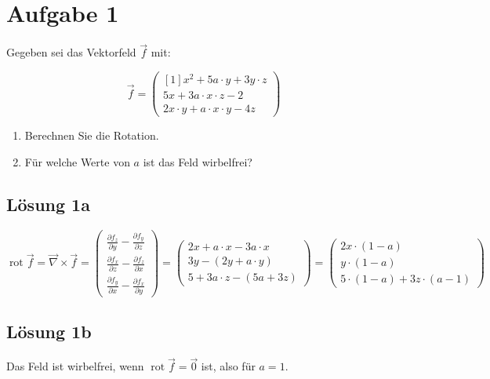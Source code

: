 \documentclass[main.tex]{subfiles}
\begin{document}
\section{Aufgabe 1}
Gegeben sei das Vektorfeld $\vec{f}$ mit:

$$
    \vec{f} = \begin{pmatrix}[1]
        x^2 + 5a \cdot y + 3y\cdot z \\
        5x + 3a\cdot x\cdot z - 2 \\
        2x\cdot y + a\cdot x \cdot y - 4z
    \end{pmatrix}
$$
\begin{enumerate}
    \item Berechnen Sie die Rotation.
    \item Für welche Werte von $a$ ist das Feld wirbelfrei?
\end{enumerate}

\subsection{Lösung 1a}

\arraycolsep=1pt %

$$
    \operatorname{rot} \vec{f} = \vec{\nabla} \times \vec{f} = \begin{pmatrix}
        \frac{\partial f_z}{\partial y} - \frac{\partial f_y}{\partial z} \\
        \frac{\partial f_x}{\partial z} - \frac{\partial f_z}{\partial x} \\
        \frac{\partial f_y}{\partial x} - \frac{\partial f_x}{\partial y}
    \end{pmatrix} = \begin{pmatrix}
        2x + a\cdot x - 3a\cdot x\\
        3y - (2y + a\cdot y) \\
        5 + 3a\cdot z - (5a + 3z)
    \end{pmatrix} = \begin{pmatrix}
        2x \cdot (1 - a)\\
        y \cdot (1 - a) \\
        5\cdot (1-a) + 3z\cdot (a-1)
    \end{pmatrix}
$$

\subsection{Lösung 1b}

Das Feld ist wirbelfrei, wenn $\operatorname{rot} \vec{f} = \vec{0}$ ist, also für $a = 1$.
\end{document}
